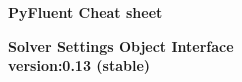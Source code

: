\documentclass[9pt,landscape]{article}
\begin{document}
\raggedright
\footnotesize


\begin{center}
     \Huge{\textbf{PyFluent Cheat sheet}} \\
\end{center}
\begin{center}
     \Large{\textbf{Solver Settings Object Interface}} \\
     \small{\textbf{version:0.13 (stable)}} \\
\end{center}

\vspace{-0.15cm}
\noindent\makebox[\linewidth]{\rule{\paperwidth}{2pt}}
\end{document}
